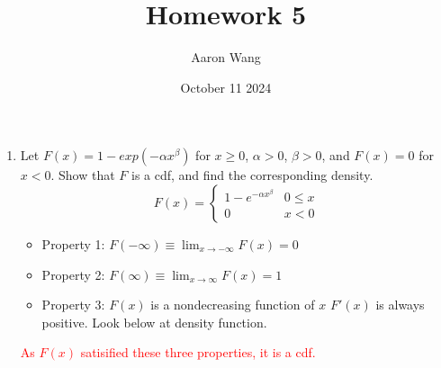 \documentclass{article}
\title{Homework 5}
\author{Aaron Wang}
\date{October 11 2024}
\begin{document}
\maketitle
\begin{enumerate}
    \item Let $F(x) = 1 - exp(- \alpha x^{\beta})$ for $x \geq 0$, $\alpha > 0$, $\beta > 0$, and $F(x) = 0$ for $x<0$. Show that $F$ is a cdf, and find the corresponding density.
    \[
    F(x)=
    \begin{cases}
        1 - e^{- \alpha x^{\beta}} & 0 \leq x  \\
        0 & x < 0
    \end{cases}
    \]
    
    \begin{itemize}
        \item []Property 1: \(F(-\infty) \equiv \displaystyle \lim_{x\to-\infty} F(x) = 0\)
        \item []Property 2: \(F(\infty) \equiv \displaystyle \lim_{x\to\infty} F(x) = 1\)
        \item []Property 3: $F(x)$ is a nondecreasing function of $x$ $F'(x)$ is always positive. Look below at density function.
    \end{itemize}
    \textcolor{red}{ As $F(x)$ satisified these three properties, it is a cdf.}



\end{enumerate}
\end{document}
